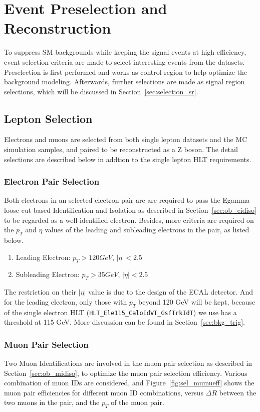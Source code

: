 \section{Event Preselection and Reconstruction}
To suppress SM backgrounds while keeping the signal events at high efficiency, event selection criteria are made to select interesting events from the datasets. Preselection is first performed and works as control region to help optimize the background modeling. Afterwards, further selections are made as signal region selections, which will be discussed in Section~\ref{sec:selection_sr}.

\subsection{Lepton Selection}
Electrons and muons are selected from both single lepton datasets and the MC simulation samples, and paired to be reconstructed as a Z boson. The detail selections are described below in addtion to the single lepton HLT requirements.
\subsubsection{Electron Pair Selection}
Both electrons in an selected electron pair are are required to pass the Egamma loose cut-based Identification and Isolation as described in Section~\ref{sec:ob_eidiso} to be regarded as a well-identified electron. Besides, more criteria are required on the $p_T$ and $\eta$ values of the leading and subleading electrons in the pair, as listed below.
\begin{enumerate}
\item Leading Electron: $p_T >120 GeV$, $|\eta|<2.5$
\item Subleading Electron: $p_T >35 GeV$, $|\eta|<2.5$
\end{enumerate}

The restriction on their $|\eta|$ value is due to the design of the ECAL detector. And for the leading electron, only those with $p_T$ beyond 120 GeV will be kept, because of the single electron HLT (\texttt{HLT\_Ele115\_CaloIdVT\_GsfTrkIdT}) we use has a threshold at 115 GeV. More discussion can be found in Section~\ref{sec:bkg_trig}.

\subsubsection{Muon Pair Selection}\label{sec:muonselection}
Two Muon Identifications are involved in the muon pair selection as described in Section~\ref{sec:ob_midiso}, to optimize the muon pair selection efficiency. Various combination of muon IDs are considered, and Figure~\ref{fig:sel_mumueff} shows the muon pair efficiencies for different muon ID combinations, versus $\Delta R$ between the two muons in the pair, and the $p_T$ of the muon pair.


